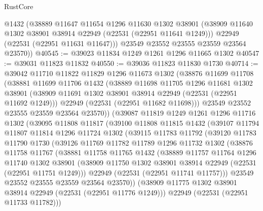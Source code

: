 \begin{lexlean}{RustCore}
\begin{coremodule}
        @1432
        (@38889
          @11647
          @11654
          @1296
          @11630
          @1302
          @38901
          (@38909 @11640 @1302 @38901 @38914 @22949 (@22531 (@22951 @11641 @1249)))
          @22949
          (@22531 (@22951 @11631 @11647)))
        @23549
        @23552
        @23555
        @23559
        @23564
        @23570))
@40545 := @39023 @11834 @1249 @1261 @1296 @11665 @1302
@40547 := @39031 @11823 @11832
@40550 := @39036 @11823 @11830 @1730
@40714 := @39042
    @11710
    @11822
    @11829
    @1296
    @11673
    @1302
    (@38876
      @11699
      @11708
      (@38881
        @11699
        @11706
        @1432
        (@38889
          @11698
          @11705
          @1296
          @11681
          @1302
          @38901
          (@38909 @11691 @1302 @38901 @38914 @22949 (@22531 (@22951 @11692 @1249)))
          @22949
          (@22531 (@22951 @11682 @11698)))
        @23549
        @23552
        @23555
        @23559
        @23564
        @23570))
    (@39087
      @11819
      @1249
      @1261
      @1296
      @11716
      @1302
      (@39095
        @11808
        @11817
        (@39100
          @11808
          @11815
          @1432
          (@39107
            @11794
            @11807
            @11814
            @1296
            @11724
            @1302
            (@39115
              @11783
              @11792
              (@39120
                @11783
                @11790
                @1730
                (@39126
                  @11769
                  @11782
                  @11789
                  @1296
                  @11732
                  @1302
                  (@38876
                    @11758
                    @11767
                    (@38881
                      @11758
                      @11765
                      @1432
                      (@38889
                        @11757
                        @11764
                        @1296
                        @11740
                        @1302
                        @38901
                        (@38909 @11750 @1302 @38901 @38914 @22949 (@22531 (@22951 @11751 @1249)))
                        @22949
                        (@22531 (@22951 @11741 @11757)))
                      @23549
                      @23552
                      @23555
                      @23559
                      @23564
                      @23570))
                  (@38909 @11775 @1302 @38901 @38914 @22949 (@22531 (@22951 @11776 @1249)))
                  @22949
                  (@22531 (@22951 @11733 @11782)))

\end{coremodule}
\end{lexlean}
